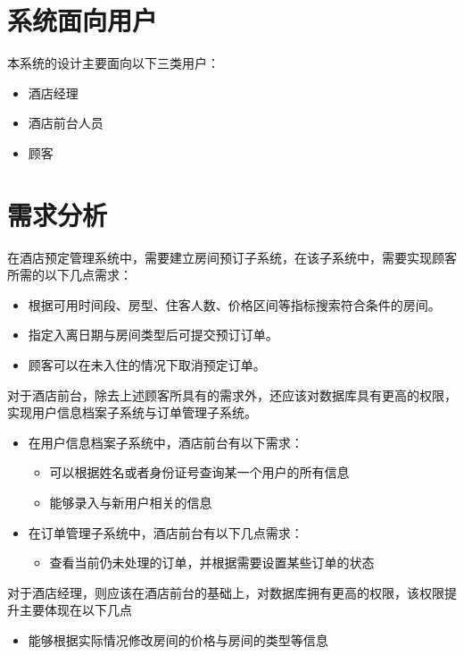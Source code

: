 \documentclass{myreport}
\begin{document}
\section{系统面向用户}

本系统的设计主要面向以下三类用户：

\begin{itemize}
    \item 酒店经理
    \item 酒店前台人员
    \item 顾客
\end{itemize}

\section{需求分析}

在酒店预定管理系统中，需要建立房间预订子系统，在该子系统中，需要实现顾客所需的以下几点需求：

\begin{itemize}
    \item 根据可用时间段、房型、住客人数、价格区间等指标搜索符合条件的房间。
    \item 指定入离日期与房间类型后可提交预订订单。
    \item 顾客可以在未入住的情况下取消预定订单。
\end{itemize}

对于酒店前台，除去上述顾客所具有的需求外，还应该对数据库具有更高的权限，实现用户信息档案子系统与订单管理子系统。

\begin{itemize}
    \item 在用户信息档案子系统中，酒店前台有以下需求：
    \begin{itemize}
        \item 可以根据姓名或者身份证号查询某一个用户的所有信息
        \item 能够录入与新用户相关的信息
    \end{itemize}
    \item 在订单管理子系统中，酒店前台有以下几点需求：
    \begin{itemize}
        \item 查看当前仍未处理的订单，并根据需要设置某些订单的状态
    \end{itemize}
\end{itemize}


对于酒店经理，则应该在酒店前台的基础上，对数据库拥有更高的权限，该权限提升主要体现在以下几点

\begin{itemize}
    \item 能够根据实际情况修改房间的价格与房间的类型等信息
\end{itemize}
\end{document}
